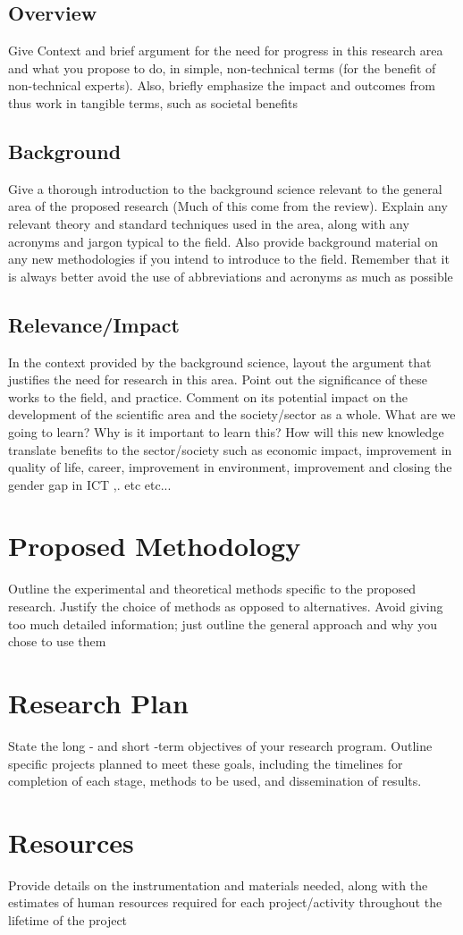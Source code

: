 \documentclass{article}
\begin{document}
\subsection{Overview}

Give Context and brief argument for the need for progress in this research area and what you propose to do, in simple, non-technical terms (for the benefit of non-technical experts). Also, briefly emphasize the impact and outcomes from thus work in tangible terms, such as societal benefits
\subsection{Background}

Give a thorough introduction to the background science relevant to the general area of the proposed research (Much of this come from the review). Explain any relevant theory and standard techniques used in the area, along with any acronyms and jargon typical to the field. Also provide background material on any new methodologies if you intend to introduce to the field. Remember that it is always better avoid the use of abbreviations and acronyms as much as possible

\subsection{Relevance/Impact}

In the context provided by the background science, layout the argument that justifies the need for research in this area. Point out the significance of these works to the field, and practice. Comment on its potential impact on the development of the scientific area and the society/sector as a whole. What are we going to learn? Why is it important to learn this? How will this new knowledge translate benefits to the sector/society such as economic impact, improvement in quality of life, career, improvement in environment, improvement and closing the gender gap in ICT ,. etc etc...

\section{Proposed Methodology}
Outline the experimental and theoretical methods specific to the proposed research. Justify the choice of methods as opposed to alternatives. Avoid giving too much detailed information; just outline the general approach and why you chose to use them

\section{Research Plan}
State the long - and short -term objectives of your research program. Outline specific projects planned to meet these goals, including the timelines for completion of each stage, methods to be used, and dissemination of results. 

\section{Resources}
Provide details on the instrumentation and materials needed, along with the estimates of human resources required for each project/activity throughout the lifetime of the project



\end{document}
